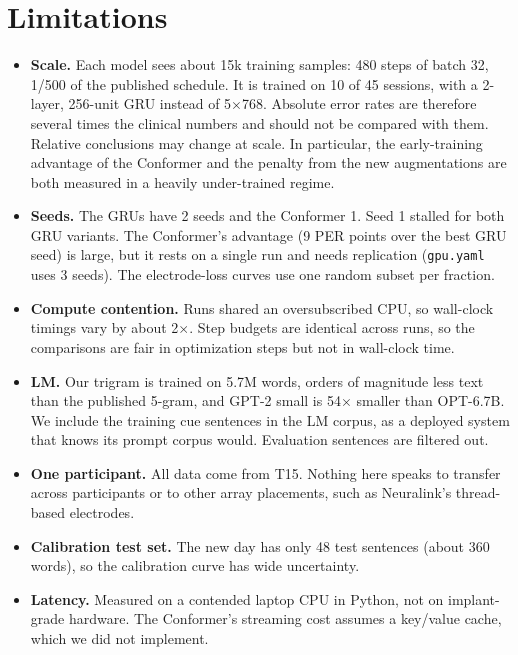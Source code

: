 \section{Limitations}
\label{sec:limits}
\begin{itemize}\itemsep0pt
\item \textbf{Scale.} Each model sees about 15k training samples: 480 steps of batch 32, 1/500 of the published schedule. It is trained on 10 of 45 sessions, with a 2-layer, 256-unit GRU instead of 5$\times$768. Absolute error rates are therefore several times the clinical numbers and should not be compared with them. Relative conclusions may change at scale. In particular, the early-training advantage of the Conformer and the penalty from the new augmentations are both measured in a heavily under-trained regime.
\item \textbf{Seeds.} The GRUs have 2 seeds and the Conformer 1. Seed 1 stalled for both GRU variants. The Conformer's advantage (9 PER points over the best GRU seed) is large, but it rests on a single run and needs replication (\texttt{gpu.yaml} uses 3 seeds). The electrode-loss curves use one random subset per fraction.
\item \textbf{Compute contention.} Runs shared an oversubscribed CPU, so wall-clock timings vary by about 2$\times$. Step budgets are identical across runs, so the comparisons are fair in optimization steps but not in wall-clock time.
\item \textbf{LM.} Our trigram is trained on 5.7M words, orders of magnitude less text than the published 5-gram, and GPT-2 small is 54$\times$ smaller than OPT-6.7B. We include the training cue sentences in the LM corpus, as a deployed system that knows its prompt corpus would. Evaluation sentences are filtered out.
\item \textbf{One participant.} All data come from T15. Nothing here speaks to transfer across participants or to other array placements, such as Neuralink's thread-based electrodes.
\item \textbf{Calibration test set.} The new day has only 48 test sentences (about 360 words), so the calibration curve has wide uncertainty.
\item \textbf{Latency.} Measured on a contended laptop CPU in Python, not on implant-grade hardware. The Conformer's streaming cost assumes a key/value cache, which we did not implement.
\end{itemize}

